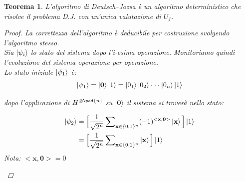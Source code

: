 \documentclass[12pt,a4paper,openright]{report}
\newtheorem{mythm}{Teorema}[chapter]
\begin{document}
\begin{mythm}
    L'algoritmo di Deutsch–Jozsa è un algoritmo deterministico che risolve il problema D.J. con un'unica valutazione di $U_f$.   

\begin{proof}
    La correttezza dell'algoritmo è deducibile per costruzione svolgendo l'algoritmo stesso.\\
    Sia $\ket{\psi_i}$ lo stato del sistema dopo l'i-esima operazione. Monitoriamo quindi l'evoluzione del sistema operazione per operazione.\\
    Lo stato iniziale $\ket{\psi_1}$ è:
\[    
    \ket{\psi_1} = \ket{\textbf{0}}\ket{1} = \ket{0_1}\ket{0_2}\cdot\cdot\cdot\ket{0_n}\ket{1}
\]

\noindent dopo l'applicazione di $H^{\otimes\ped{n}}$ su $\ket{\textbf{0}}$ il sistema si troverà nello stato:

\begin{centering}
    \begin{align*}
        \ket{\psi_2} &= \Big[\frac{1}{\sqrt{2^n}}\sum\nolimits_{\textbf{x}\in{\{0,1\}^n}}(-1)^{<\textbf{x},\textbf{0}>}\ket{\textbf{x}}\Big]\ket{1} \\ 
                     &= \Big[\frac{1}{\sqrt{2^n}}\sum\nolimits_{\textbf{x}\in{\{0,1\}^n}}\ket{\textbf{x}}\Big]\ket{1}
    \end{align*}
    \textit{Nota: $<\textbf{x},\textbf{0}> = 0$}
\end{centering}



\end{proof}
\end{mythm}
\end{document}
